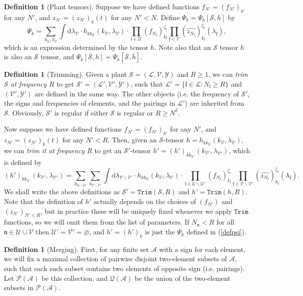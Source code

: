 \documentclass[11 pt,reqno]{amsart}
\theoremstyle{definition}
\newtheorem{df}[thm]{Definition}
\theoremstyle{remark}
\numberwithin{equation}{section}
\newcommand{\Sc}{\mathcal{S}}
\newcommand{\Lc}{\mathcal{L}}
\newcommand{\Qc}{\mathcal{Q}}
\newcommand{\Uc}{\mathcal{U}}
\newcommand{\Ac}{\mathcal{A}}
\newcommand{\Vc}{\mathcal{V}}
\newcommand{\Yc}{\mathcal{Y}}
\newcommand{\ff}{\mathfrak{f}}
\newcommand{\nf}{\mathfrak{n}}
\newcommand{\lf}{\mathfrak{l}}
\newcommand{\Ps}{\mathscr{P}}
\begin{document}
{\begin{df}[Plant tensors]
 Suppose we have defined functions $f_{N'}=(f_{N'})_{k'}$ for any $N'$, and $z_{N'}=(z_{N'})_k(t)$ for any $N'<N$. Define $\Psi_k=\Psi_k[\Sc,h]$ by
 \begin{equation}\label{defpsi}\Psi_k=\sum_{k_\Uc,k_\Vc}\int\mathrm{d}\lambda_\Vc\cdot h_{kk_\Uc}(k_\Vc,\lambda_\Vc)\cdot\prod_{\lf\in\Uc}(f_{N_\lf})_{k_\lf}^{\zeta_\lf}\prod_{\ff\in\Vc}(\widehat{z_{N_\ff}})_{k_\ff}^{\zeta_\ff}(\lambda_\ff),
 \end{equation} which is an expression determined by the tensor $h$. Note also that an $\Sc$ tensor $h$ is also an $\overline{\Sc}$ tensor, and $\overline{\Psi_k[\Sc,h]}=\Psi_k[\overline{\Sc},\overline{h}]$.
 \end{df}
 \begin{df}[Trimming]\label{deftrim} Given a plant $\Sc=(\Lc,\Vc,\Yc)$ and $R\geq 1$, we can \emph{trim $\Sc$ at frequency $R$} to get $\Sc'=(\Lc',\Vc',\Yc')$, such that $\Lc'=\{\lf\in\Lc:N_\lf\geq R\}$ and $(\Vc',\Yc')$ are defined in the same way. The other objects (i.e. the frequency of $\Sc'$, the signs and frequencies of elements, and the pairings in $\Lc'$) are inherited from $\Sc$. Obviously, $\Sc'$ is regular if either $\Sc$ is regular or $R\geq N^\delta$.
 
 Now suppose we have defined functions $f_{N'}=(f_{N'})_{k'}$ for any $N'$, and $z_{N'}=(z_{N'})_k(t)$ for any $N'<R$. Then, given an $\Sc$-tensor $h=h_{kk_\Uc }(k_\Vc,\lambda_{\Vc})$, we can \emph{trim it at frequency $R$} to get an $\Sc'$-tensor $h'=(h')_{kk_{\Uc'}}(k_{\Vc'},\lambda_{\Vc'})$, which is defined by
 \begin{equation}\label{trim1}(h')_{kk_{\Uc'}}(k_{\Vc'},\lambda_{\Vc'})=\sum_{k_{\Uc\backslash\Uc'}}\sum_{k_{\Vc\backslash\Vc'}}\int\mathrm{d}\lambda_{\Vc\backslash\Vc'}\cdot h_{kk_\Uc}(k_\Vc,\lambda_{\Vc})\cdot\prod_{\lf\in\Uc\backslash\Uc'}(f_{N_\lf})_{k_\lf}^{\zeta_\lf}\prod_{\ff\in\Vc\backslash\Vc'}(\widehat{z_{N_\ff}})_{k_\ff}^{\zeta_\ff}(\lambda_\ff).
 \end{equation} We shall write the above definitions as $\Sc'=\mathtt{Trim}(\Sc,R)$ and $h'=\mathtt{Trim}(h,R)$. Note that the definition of $h'$ actually depends on the choices of $(f_{N'})$ and $(z_{N'})_{N'<R}$, but in practice these will be uniquely fixed whenever we apply $\mathtt{Trim}$ functions, so we will omit them from the list of parameters. If $N_\nf<R$ for all $\nf\in\Uc\cup\Vc$ then $\Uc'=\Vc'=\varnothing$, and $h'=(h')_k$ is just the $\Psi_k$ defined in (\ref{defpsi}).
 \end{df}
 \begin{df}[Merging]\label{defmerge} First, for any finite set $\Ac$ with a sign for each element, we will fix a maximal collection of pairwise disjoint two-element subsets of $\Ac$, such that each such subset contains two elements of opposite sign (i.e. pairings). Let $\Ps(\Ac)$ be this collection, and $\Qc(\Ac)$ be the union of the two-element subsets in $\Ps(\Ac)$.
 

\end{df}}
\end{document}
